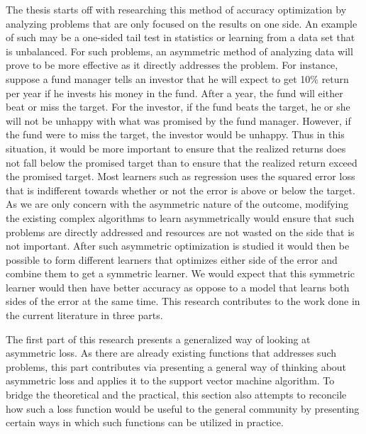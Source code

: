 The thesis starts off with researching this method of accuracy optimization by analyzing problems that are only focused on the results on one side. An example of such may be a one-sided tail test in statistics or learning from a data set that is unbalanced. For such problems, an asymmetric method of analyzing data will prove to be more effective as it directly addresses the problem. For instance, suppose a fund manager tells an investor that he will expect to get 10\% return per year if he invests his money in the fund. After a year, the fund will either beat or miss the target. For the investor, if the fund beats the target, he or she will not be unhappy with what was promised by the fund manager. However,
if the fund were to miss the target, the investor would be unhappy. Thus in this situation, it would be more important to ensure that the realized returns does not fall below the promised target than to ensure that the realized return exceed the promised target. Most learners such as regression uses the squared error loss that is indifferent towards whether or not the error is above or below the target. As we are only concern with the asymmetric nature of the outcome, modifying the existing complex algorithms to learn asymmetrically would ensure that such problems are directly addressed and resources are not wasted on the side that is not important. After such asymmetric optimization is studied it would then be possible to form different learners that optimizes either side of the error and combine them to get a symmetric learner. We would expect that this symmetric learner would then have better accuracy as oppose to a model that learns both sides of the error at the same time. This research contributes to the work done in the current literature in three parts. 

The first part of this research presents a generalized way of looking at asymmetric loss. As there are already existing functions that addresses such problems, this part contributes via presenting a general way of thinking about asymmetric loss and applies it to the support vector machine algorithm. To bridge the theoretical and the practical, this section also attempts to reconcile how such a loss function would be useful to the general community by presenting certain ways in which such functions can be utilized in practice. 

